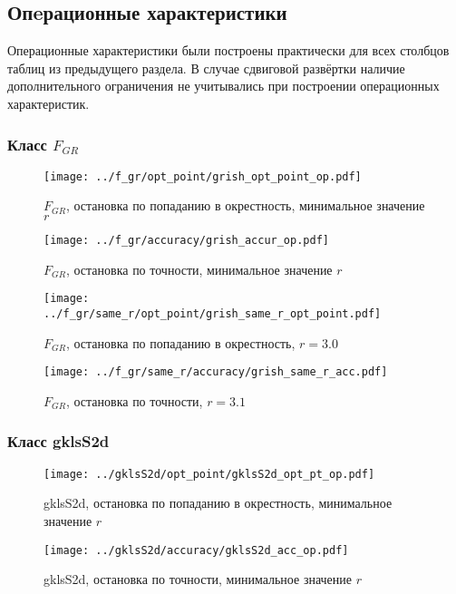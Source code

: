 \documentclass[a4paper]{article}
\begin{document}
\subsection{Опeрационные характеристики}
Операционные характеристики были построены практически для всех столбцов таблиц из предыдущего раздела.
В случае сдвиговой развёртки наличие дополнительного ограничения не учитывались при построении операционных характеристик.
\subsubsection{Класс $F_{GR}$}

\begin{figure}
  \center
  \texttt{[image: ../f\_gr/opt\_point/grish\_opt\_point\_op.pdf]}
  \caption{$F_{GR}$, остановка по попаданию в окрестность, минимальное значение $r$}
  \label{fig:}
\end{figure}

\begin{figure}[H]
  \center
  \texttt{[image: ../f\_gr/accuracy/grish\_accur\_op.pdf]}
  \caption{$F_{GR}$, остановка по точности, минимальное значение $r$}
  \label{fig:}
\end{figure}

\begin{figure}[H]
  \center
  \texttt{[image: ../f\_gr/same\_r/opt\_point/grish\_same\_r\_opt\_point.pdf]}
  \caption{$F_{GR}$, остановка по попаданию в окрестность, $r=3.0$}
  \label{fig:}
\end{figure}

\begin{figure}[H]
  \center
  \texttt{[image: ../f\_gr/same\_r/accuracy/grish\_same\_r\_acc.pdf]}
  \caption{$F_{GR}$, остановка по точности, $r=3.1$}
  \label{fig:}
\end{figure}

\subsubsection{Класс gklsS2d}

\begin{figure}
  \center
  \texttt{[image: ../gklsS2d/opt\_point/gklsS2d\_opt\_pt\_op.pdf]}
  \caption{gklsS2d, остановка по попаданию в окрестность, минимальное значение $r$}
  \label{fig:}
\end{figure}

\begin{figure}[H]
  \center
  \texttt{[image: ../gklsS2d/accuracy/gklsS2d\_acc\_op.pdf]}
  \caption{gklsS2d, остановка по точности, минимальное значение $r$}
  \label{fig:}
\end{figure}
\end{document}
